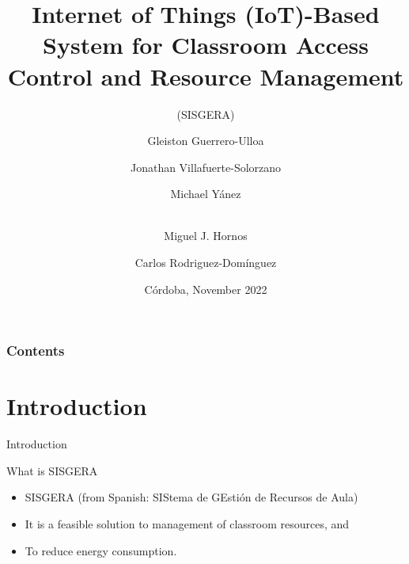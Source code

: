 \documentclass[notes=show, 10pt, xcolor=table]{beamer}
\title[UCAmI 2022]{Internet of Things (IoT)-Based System for Classroom Access Control and Resource Management}
\subtitle{(SISGERA)}
\author[Gleiston Guerrero-Ulloa]{Gleiston Guerrero-Ulloa \and Jonathan Villafuerte-Solorzano \and Michael Yánez  \and \\Miguel J. Hornos \and Carlos Rodriguez-Domínguez}
\institute[gguerrero@uteq.edu.ec]{Technical State University of Quevedo, and University of Granada}
\date[Córdoba, November 2022]{Córdoba, November 2022}
\begin{document}
\frame{\titlepage}
\begin{frame}
\frametitle{Contents}
\tableofcontents
\end{frame}
\section{Introduction}
    \begin{frame}{Introduction}
        \begin{block}{What is SISGERA}
            \begin{itemize}
            	\item SISGERA (from Spanish: SIStema de GEstión de Recursos de Aula)
            	\item It is a feasible solution to management of classroom resources, and 
            	\item To reduce energy consumption.
            \end{itemize} 
        \end{block}
        

\end{frame}
\end{document}
